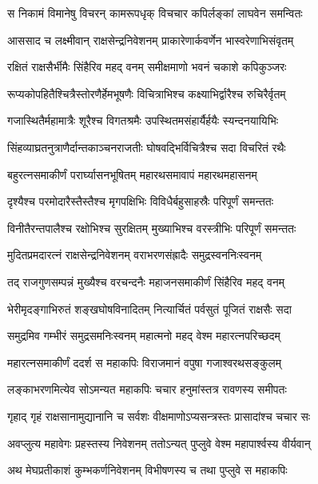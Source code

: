 
\twolineshloka
{स निकामं विमानेषु विचरन् कामरूपधृक्}
{विचचार कपिर्लङ्कां लाघवेन समन्वितः} %

\twolineshloka
{आससाद च लक्ष्मीवान् राक्षसेन्द्रनिवेशनम्}
{प्राकारेणार्कवर्णेन भास्वरेणाभिसंवृतम्} %

\twolineshloka
{रक्षितं राक्षसैर्भीमैः सिंहैरिव महद् वनम्}
{समीक्षमाणो भवनं चकाशे कपिकुञ्जरः} %

\twolineshloka
{रूप्यकोपहितैश्चित्रैस्तोरणैर्हेमभूषणैः}
{विचित्राभिश्च कक्ष्याभिर्द्वारैश्च रुचिरैर्वृतम्} %

\twolineshloka
{गजास्थितैर्महामात्रैः शूरैश्च विगतश्रमैः}
{उपस्थितमसंहार्यैर्हयैः स्यन्दनयायिभिः} %

\twolineshloka
{सिंहव्याघ्रतनुत्राणैर्दान्तकाञ्चनराजतीः}
{घोषवद्भिर्विचित्रैश्च सदा विचरितं रथैः} %

\twolineshloka
{बहुरत्नसमाकीर्णं परार्घ्यासनभूषितम्}
{महारथसमावापं महारथमहासनम्} %

\twolineshloka
{दृश्यैश्च परमोदारैस्तैस्तैश्च मृगपक्षिभिः}
{विविधैर्बहुसाहस्रैः परिपूर्णं समन्ततः} %

\twolineshloka
{विनीतैरन्तपालैश्च रक्षोभिश्च सुरक्षितम्}
{मुख्याभिश्च वरस्त्रीभिः परिपूर्णं समन्ततः} %

\twolineshloka
{मुदितप्रमदारत्नं राक्षसेन्द्रनिवेशनम्}
{वराभरणसंह्रादैः समुद्रस्वननिःस्वनम्} %

\twolineshloka
{तद् राजगुणसम्पन्नं मुख्यैश्च वरचन्दनैः}
{महाजनसमाकीर्णं सिंहैरिव महद् वनम्} %

\twolineshloka
{भेरीमृदङ्गाभिरुतं शङ्खघोषविनादितम्}
{नित्यार्चितं पर्वसुतं पूजितं राक्षसैः सदा} %

\twolineshloka
{समुद्रमिव गम्भीरं समुद्रसमनिःस्वनम्}
{महात्मनो महद् वेश्म महारत्नपरिच्छदम्} %

\twolineshloka
{महारत्नसमाकीर्णं ददर्श स महाकपिः}
{विराजमानं वपुषा गजाश्वरथसङ्कुलम्} %

\twolineshloka
{लङ्काभरणमित्येव सोऽमन्यत महाकपिः}
{चचार हनुमांस्तत्र रावणस्य समीपतः} %

\twolineshloka
{गृहाद् गृहं राक्षसानामुद्यानानि च सर्वशः}
{वीक्षमाणोऽप्यसन्त्रस्तः प्रासादांश्च चचार सः} %

\twolineshloka
{अवप्लुत्य महावेगः प्रहस्तस्य निवेशनम्}
{ततोऽन्यत् पुप्लुवे वेश्म महापार्श्वस्य वीर्यवान्} %

\twolineshloka
{अथ मेघप्रतीकाशं कुम्भकर्णनिवेशनम्}
{विभीषणस्य च तथा पुप्लुवे स महाकपिः} %

